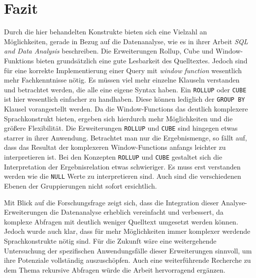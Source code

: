 \chapter{Fazit}
\label{chap:fazit} Durch die hier behandelten Konstrukte bieten sich eine Vielzahl
an Möglichkeiten, gerade in Bezug auf die Datenanalyse, wie es \citet{FOTACHE2015243}
in ihrer Arbeit \textit{SQL and Data Analysis} beschreiben. Die Erweiterungen
Rollup, Cube und Window-Funktions bieten grundsätzlich eine gute Lesbarkeit des Quelltextes.
Jedoch sind für eine korrekte Implementierung einer Query mit \textit{window
function} wesentlich mehr Fachkenntnisse nötig. Es müssen viel mehr einzelne
Klauseln verstanden und betrachtet werden, die alle eine eigene Syntax haben.
Ein \texttt{ROLLUP} oder \texttt{CUBE} ist hier wesentlich einfacher zu
handhaben. Diese können lediglich der \texttt{GROUP BY} Klausel vorangestellt
werden. Da die Window-Functions das deutlich komplexere Sprachkonstrukt bieten,
ergeben sich hierdurch mehr Möglichkeiten und die größere Flexibilität. Die Erweiterungen
\texttt{ROLLUP} und \texttt{CUBE} sind hingegen etwas starrer in ihrer Anwendung.
Betrachtet man nur die Ergebnismenge, so fällt auf, dass das Resultat der
komplexeren Window-Functions anfangs leichter zu interpretieren ist. Bei den Konzepten
\texttt{ROLLUP} und \texttt{CUBE} gestaltet sich die Interpretation der Ergebnisrelation
etwas schwieriger. Es muss erst verstanden werden wie die \texttt{NULL} Werte zu
interpretieren sind. Auch sind die verschiedenen Ebenen der Gruppierungen nicht
sofort ersichtlich.

Mit Blick auf die Forschungsfrage zeigt sich, dass die Integration dieser Analyse-Erweiterungen
die Datenanalyse erheblich vereinfacht und verbessert, da komplexe Abfragen mit
deutlich weniger Quelltext umgesetzt werden können. Jedoch wurde auch klar, dass
für mehr Möglichkeiten immer komplexer werdende Sprachkonstrukte nötig sind. Für
die Zukunft wäre eine weitergehende Untersuchung der spezifischen Anwendungsfälle
dieser Erweiterungen sinnvoll, um ihre Potenziale vollständig auszuschöpfen. Auch
eine weiterführende Recherche zu dem Thema rekursive Abfragen würde die Arbeit hervorragend
ergänzen.